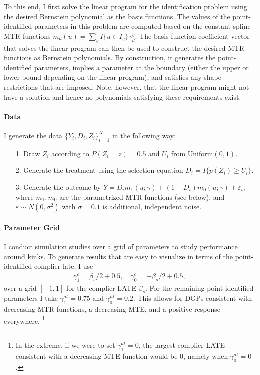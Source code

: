 \documentclass[12pt,a4paper,english]{article} %
\numberwithin{equation}{section}
\theoremstyle{definition}
\theoremstyle{remark}
\theoremstyle{plain}
\begin{document}
To this end, I first solve the linear program for the identification problem using the desired Bernstein polynomial as the basis functions.
The values of the point-identified parameters in this problem are computed based on the constant spline MTR functions $m_d(u) = \sum_g I\{u \in I_g\} \gamma_d^g$.
The basis function coefficient vector that solves the linear program can then be used to construct the desired MTR functions as Bernstein polynomials.
By construction, it generates the point-identified parameters, implies a parameter at the boundary (either the upper or lower bound depending on the linear program), and satisfies any shape restrictions that are imposed.
Note, however, that the linear program might not have a solution and hence no polynomials satisfying these requirements exist.

\paragraph{Data}
I generate the data $\{Y_i, D_i, Z_i\}_{i=1}^N$ in the following way:
\begin{itemize}
  \item[1.] Draw $Z_i$ according to $P(Z_i=z) = 0.5$ and $U_i$ from $\text{Uniform}(0,1)$.
  \item[2.] Generate the treatment using the selection equation $D_i = I\{p(Z_i) \geq U_i\}$.
  \item[3.] Generate the outcome by $Y = D_i m_1(u; \gamma) + (1 - D_i) m_0(u; \gamma) + \varepsilon_i$,
  where $m_1, m_0$ are the parametrized MTR functions (see below), and $\varepsilon\sim N(0, \sigma^2)$ with $\sigma=0.1$ is additional, independent noise.
\end{itemize}

\paragraph{Parameter Grid}
I conduct simulation studies over a grid of parameters to study performance around kinks.
To generate results that are easy to visualize in terms of the point-identified complier late, I use
\begin{align}
  \gamma_1^c = \beta_s / 2 + 0.5, \quad \gamma_0^c = -\beta_s / 2 + 0.5,
\end{align}
over a grid $[-1, 1]$ for the complier LATE $\beta_s$.
For the remaining point-identified parameters I take $\gamma_1^{at} = 0.75$ and $\gamma_0^{nt} = 0.2$.
This allows for DGPs consistent with decreasing MTR functions, a decreasing MTE, and a positive response everywhere.
\footnote{In the extreme, if we were to set $\gamma_1^{at} = 0$, the largest complier LATE consistent with a decreasing MTE function would be $0$, namely when $\gamma_0^{at}=0$.}
\end{document}

